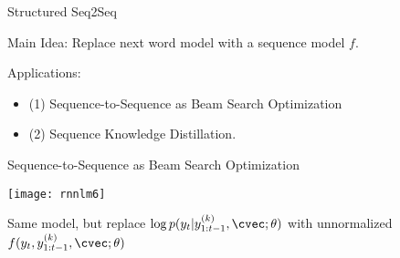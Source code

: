   




\begin{frame}{Structured Seq2Seq}

  Main Idea: Replace next word model with a sequence model $f$. 

  
  \air 

  Applications:

  \begin{itemize}
  \item (1) Sequence-to-Sequence as Beam Search Optimization 
    \air 
  \item (2) Sequence Knowledge Distillation.
    \air 
  \end{itemize}
\end{frame}

\begin{frame}{Sequence-to-Sequence as Beam Search Optimization}
  \begin{center}
    \texttt{[image: rnnlm6]}
  \end{center}

  Same model, but replace 
  $  \log p(y_{t} | y^{(k)}_{1:t-1}, \cvec; \theta)$
  with unnormalized 
  $f(y_t, y_{1:t-1}^{(k)}, \cvec; \theta)$
\end{frame}

